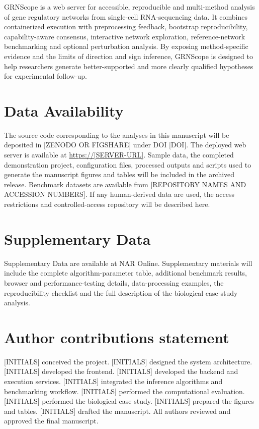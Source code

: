 \documentclass[unnumsec,webpdf,modern,large]{oup-authoring-template}%
\begin{document}
GRNScope is a web server for accessible, reproducible and multi-method analysis of gene regulatory networks from single-cell RNA-sequencing data. It combines containerized execution with preprocessing feedback, bootstrap reproducibility, capability-aware consensus, interactive network exploration, reference-network benchmarking and optional perturbation analysis. By exposing method-specific evidence and the limits of direction and sign inference, GRNScope is designed to help researchers generate better-supported and more clearly qualified hypotheses for experimental follow-up.

\section{Data Availability}

The source code corresponding to the analyses in this manuscript will be deposited in [ZENODO OR FIGSHARE] under DOI [DOI]. The deployed web server is available at \url{https://[SERVER-URL]}. Sample data, the completed demonstration project, configuration files, processed outputs and scripts used to generate the manuscript figures and tables will be included in the archived release. Benchmark datasets are available from [REPOSITORY NAMES AND ACCESSION NUMBERS]. If any human-derived data are used, the access restrictions and controlled-access repository will be described here.

\section{Supplementary Data}

Supplementary Data are available at NAR Online. Supplementary materials will include the complete algorithm-parameter table, additional benchmark results, browser and performance-testing details, data-processing examples, the reproducibility checklist and the full description of the biological case-study analysis.

\section{Author contributions statement}

[INITIALS] conceived the project. [INITIALS] designed the system architecture. [INITIALS] developed the frontend. [INITIALS] developed the backend and execution services. [INITIALS] integrated the inference algorithms and benchmarking workflow. [INITIALS] performed the computational evaluation. [INITIALS] performed the biological case study. [INITIALS] prepared the figures and tables. [INITIALS] drafted the manuscript. All authors reviewed and approved the final manuscript.
\end{document}
